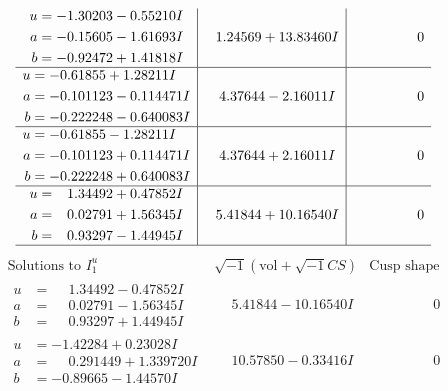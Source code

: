 \documentclass[1p]{elsarticle_modified}
\theoremstyle{definition}
\newcommand{\I}{\sqrt{-1}}
\begin{document}
$$\begin{array}{c|c|c}
\begin{aligned}
u &= -1.30203 - 0.55210 I \\
a &= -0.15605 - 1.61693 I \\
b &= -0.92472 + 1.41818 I\end{aligned}
 & \phantom{-}1.24569 + 13.83460 I & \phantom{-0.000000 } 0 \\ \hline\begin{aligned}
u &= -0.61855 + 1.28211 I \\
a &= -0.101123 - 0.114471 I \\
b &= -0.222248 - 0.640083 I\end{aligned}
 & \phantom{-}4.37644 - 2.16011 I & \phantom{-0.000000 } 0 \\ \hline\begin{aligned}
u &= -0.61855 - 1.28211 I \\
a &= -0.101123 + 0.114471 I \\
b &= -0.222248 + 0.640083 I\end{aligned}
 & \phantom{-}4.37644 + 2.16011 I & \phantom{-0.000000 } 0 \\ \hline\begin{aligned}
u &= \phantom{-}1.34492 + 0.47852 I \\
a &= \phantom{-}0.02791 + 1.56345 I \\
b &= \phantom{-}0.93297 - 1.44945 I\end{aligned}
 & \phantom{-}5.41844 + 10.16540 I & \phantom{-0.000000 } 0\\
 \hline 
 \end{array}$$\newpage$$\begin{array}{c|c|c}  
\text{Solutions to }I^u_{1}& \I (\text{vol} + \sqrt{-1}CS) & \text{Cusp shape}\\
 \hline 
\begin{aligned}
u &= \phantom{-}1.34492 - 0.47852 I \\
a &= \phantom{-}0.02791 - 1.56345 I \\
b &= \phantom{-}0.93297 + 1.44945 I\end{aligned}
 & \phantom{-}5.41844 - 10.16540 I & \phantom{-0.000000 } 0 \\ \hline\begin{aligned}
u &= -1.42284 + 0.23028 I \\
a &= \phantom{-}0.291449 + 1.339720 I \\
b &= -0.89665 - 1.44570 I\end{aligned}
 & \phantom{-}10.57850 - 0.33416 I & \phantom{-0.000000 } 0 \\ \hline\begin{aligned}

\end{aligned}
\end{array}$$
\end{document}
